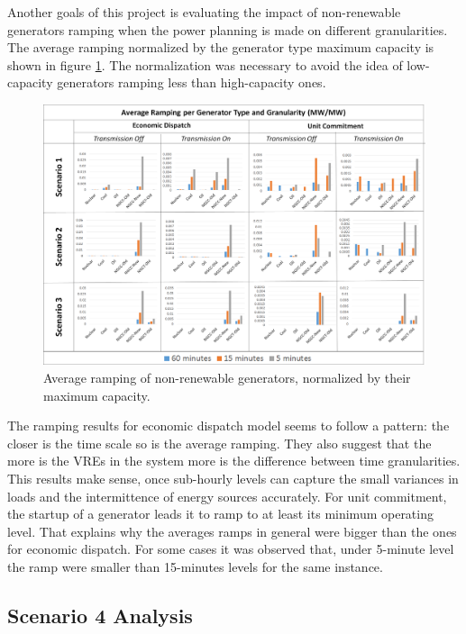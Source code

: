 \documentclass[12pt,LUDisStyle,twosided]{book}
\begin{document}
Another goals of this project is evaluating the impact of non-renewable generators ramping when the power planning is made on different granularities. The average ramping normalized by the generator type maximum capacity is shown in figure  \ref{fig:averageramping}. The normalization was necessary to avoid the idea of low-capacity generators ramping less than high-capacity ones.

\begin{figure}[!h] 
  \centering
  
	  \includegraphics[width=\textwidth,height=\textheight,keepaspectratio]{averageRamping.png}
  
  \caption{Average ramping of non-renewable generators, normalized by their maximum capacity.}
  \label{fig:averageramping}
  
\end{figure}

The ramping results for economic dispatch model seems to follow a pattern: the closer is the time scale so is the average ramping. They also suggest that the more is the VREs in the system more is the difference between time granularities. This results make sense, once sub-hourly levels can capture the small variances in loads and the intermittence of energy sources accurately. For unit commitment, the startup of a generator leads it to ramp to at least its minimum operating level. That explains why the averages ramps in general were bigger than the ones for economic dispatch. For some cases it was observed that, under 5-minute level the ramp were smaller than 15-minutes levels for the same instance. 

\subsection{Scenario 4 Analysis}
\end{document}
